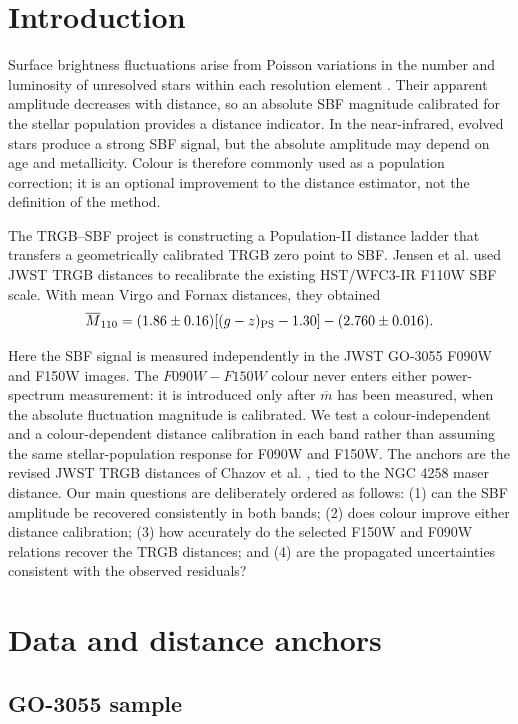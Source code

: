 \documentclass[nodoi,nocopyright]{pas}
\newcommand{\mbar}{\overline{m}}
\newcommand{\Mbar}{\overline{M}}
\begin{document}
\section{Introduction}

Surface brightness fluctuations arise from Poisson variations in the number
and luminosity of unresolved stars within each resolution element
\citep{TonrySchneider1988}. Their apparent amplitude decreases with distance,
so an absolute SBF magnitude calibrated for the stellar population provides a
distance indicator. In the near-infrared, evolved stars produce a strong SBF
signal, but the absolute amplitude may depend on age and metallicity. Colour is
therefore commonly used as a population correction; it is an optional
improvement to the distance estimator, not the definition of the method.

The TRGB--SBF project is constructing a Population-II distance ladder that
transfers a geometrically calibrated TRGB zero point to SBF. Jensen et al.
\citep[Paper III;][]{Jensen2025} used JWST TRGB distances to recalibrate the
existing HST/WFC3-IR F110W SBF scale. With mean Virgo and Fornax distances,
they obtained
\[
 \Mbar_{110}=(1.86\pm0.16)[(g-z)_{\rm PS}-1.30]-(2.760\pm0.016).
\]

Here the SBF signal is measured independently in the JWST GO-3055 F090W and
F150W images.  The $F090W-F150W$ colour never enters either power-spectrum
measurement: it is introduced only after $\mbar$ has been measured, when the
absolute fluctuation magnitude is calibrated.  We test a colour-independent
and a colour-dependent distance calibration in each band rather than assuming
the same stellar-population response for F090W and F150W.
The anchors are the revised JWST TRGB distances of Chazov et al.
\citep[Paper IV;][]{Chazov2026}, tied to the NGC 4258 maser distance. Our main
questions are deliberately ordered as follows: (1) can the SBF amplitude be
recovered consistently in both bands; (2) does colour improve either distance
calibration; (3) how accurately do the selected F150W and F090W relations
recover the TRGB distances; and (4) are the propagated uncertainties
consistent with the observed residuals?

\section{Data and distance anchors}

\subsection{GO-3055 sample}
\end{document}
